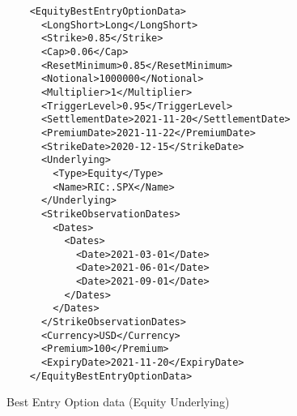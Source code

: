 \begin{listing}[H]
\begin{verbatim}
    <EquityBestEntryOptionData>
      <LongShort>Long</LongShort>
      <Strike>0.85</Strike>
      <Cap>0.06</Cap>
      <ResetMinimum>0.85</ResetMinimum>
      <Notional>1000000</Notional>
      <Multiplier>1</Multiplier>
      <TriggerLevel>0.95</TriggerLevel>
      <SettlementDate>2021-11-20</SettlementDate>
      <PremiumDate>2021-11-22</PremiumDate>
      <StrikeDate>2020-12-15</StrikeDate>
      <Underlying>
        <Type>Equity</Type>
        <Name>RIC:.SPX</Name>
      </Underlying>
      <StrikeObservationDates>
        <Dates>
          <Dates>
            <Date>2021-03-01</Date>
            <Date>2021-06-01</Date>
            <Date>2021-09-01</Date>
          </Dates>
        </Dates>
      </StrikeObservationDates>
      <Currency>USD</Currency>
      <Premium>100</Premium>
      <ExpiryDate>2021-11-20</ExpiryDate>
    </EquityBestEntryOptionData>
\end{verbatim}
\caption{Best Entry Option data (Equity Underlying)}
\label{lst:bestentryoption_data}
\end{listing}
